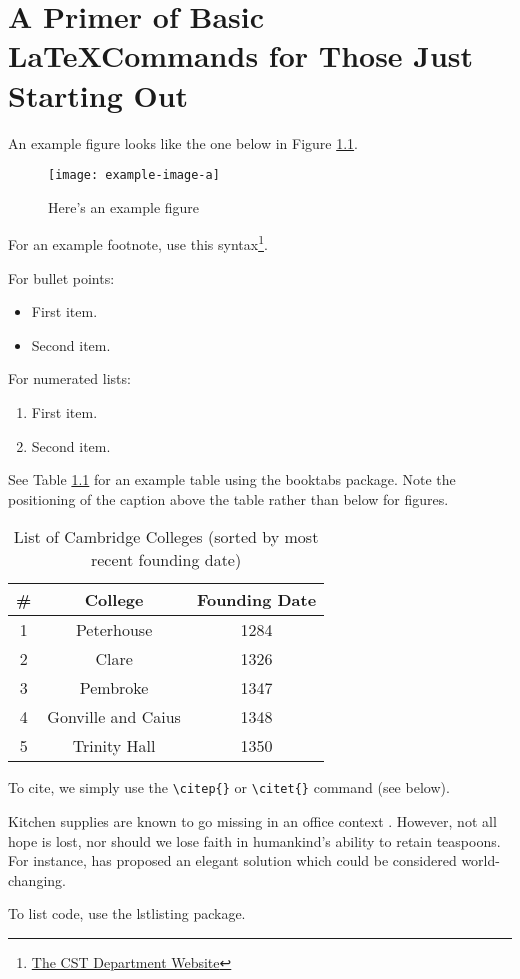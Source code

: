 \chapter{A Primer of Basic \LaTeX Commands for Those Just Starting Out}

An example figure looks like the one below in Figure \ref{fig:example-figure}.

\begin{figure}[ht]
    \centering
    \texttt{[image: example-image-a]}
    \caption{Here's an example figure}
    \label{fig:example-figure}
\end{figure}

For an example footnote, use this syntax\footnote{\href{https://www.cst.cam.ac.uk/}{The CST Department Website}}.

For bullet points:
\begin{itemize}
    \item First item.
    \item Second item.
\end{itemize}

For numerated lists:
\begin{enumerate}
    \item First item.
    \item Second item.
\end{enumerate}

See Table \ref{tab:example-table} for an example table using the booktabs package. Note the positioning of the caption above the table rather than below for figures.

\begin{table}
\centering
 \caption{List of Cambridge Colleges (sorted by most recent founding date)}
 \label{tab:example-table}
    \begin{tabular}{c c c}
        \toprule
         \textbf{\#} & \textbf{College} & \textbf{Founding Date} \\
         \midrule
            1 & Peterhouse & 1284 \\
            2 & Clare & 1326 \\
            3 & Pembroke & 1347 \\
            4 & Gonville and Caius & 1348 \\
            5 & Trinity Hall & 1350 \\
         \bottomrule
    \end{tabular}
\end{table}

To cite, we simply use the \texttt{\textbackslash citep\{\}} or \texttt{\textbackslash citet\{\}} command (see below).

Kitchen supplies are known to go missing in an office context \citep{CaseOfDisappearingTeaspoons}. However, not all hope is lost, nor should we lose faith in humankind's ability to retain teaspoons. For instance, \citet{TeaspoonSolutionProposal} has proposed an elegant solution which could be considered world-changing.

To list code, use the lstlisting package.